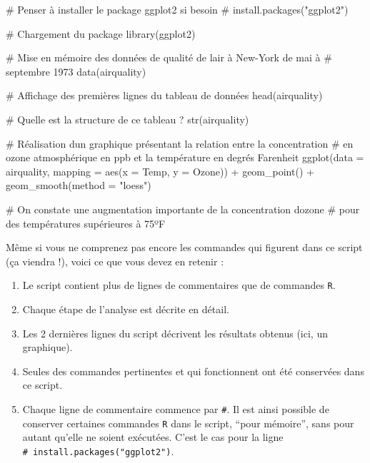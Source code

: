 \documentclass[
  letterpaper,
  DIV=11,
  numbers=noendperiod]{scrreprt}
\newenvironment{Shaded}{\begin{snugshade}}{\end{snugshade}}
\newcommand{\AttributeTok}[1]{\textcolor[rgb]{0.40,0.45,0.13}{#1}}
\newcommand{\CommentTok}[1]{\textcolor[rgb]{0.37,0.37,0.37}{#1}}
\newcommand{\FunctionTok}[1]{\textcolor[rgb]{0.28,0.35,0.67}{#1}}
\newcommand{\NormalTok}[1]{\textcolor[rgb]{0.00,0.23,0.31}{#1}}
\newcommand{\SpecialCharTok}[1]{\textcolor[rgb]{0.37,0.37,0.37}{#1}}
\newcommand{\StringTok}[1]{\textcolor[rgb]{0.13,0.47,0.30}{#1}}
\providecommand{\tightlist}{%
  \setlength{\itemsep}{0pt}\setlength{\parskip}{0pt}}\usepackage{longtable,booktabs,array}
\begin{document}
\begin{Shaded}
\begin{Highlighting}[]
\CommentTok{\# Penser à installer le package ggplot2 si besoin}
\CommentTok{\# install.packages("ggplot2")}

\CommentTok{\# Chargement du package}
\FunctionTok{library}\NormalTok{(ggplot2)}

\CommentTok{\# Mise en mémoire des données de qualité de l\textquotesingle{}air à New{-}York de mai à}
\CommentTok{\# septembre 1973}
\FunctionTok{data}\NormalTok{(airquality)}

\CommentTok{\# Affichage des premières lignes du tableau de données}
\FunctionTok{head}\NormalTok{(airquality)}

\CommentTok{\# Quelle est la structure de ce tableau ?}
\FunctionTok{str}\NormalTok{(airquality)}

\CommentTok{\# Réalisation d\textquotesingle{}un graphique présentant la relation entre la concentration}
\CommentTok{\# en ozone atmosphérique en ppb et la température en degrés Farenheit}
\FunctionTok{ggplot}\NormalTok{(}\AttributeTok{data =}\NormalTok{ airquality, }\AttributeTok{mapping =} \FunctionTok{aes}\NormalTok{(}\AttributeTok{x =}\NormalTok{ Temp, }\AttributeTok{y =}\NormalTok{ Ozone)) }\SpecialCharTok{+}
  \FunctionTok{geom\_point}\NormalTok{() }\SpecialCharTok{+}
  \FunctionTok{geom\_smooth}\NormalTok{(}\AttributeTok{method =} \StringTok{"loess"}\NormalTok{)}

\CommentTok{\# On constate une augmentation importante de la concentration d\textquotesingle{}ozone }
\CommentTok{\# pour des températures supérieures à 75ºF}
\end{Highlighting}
\end{Shaded}

Même si vous ne comprenez pas encore les commandes qui figurent dans ce
script (ça viendra !), voici ce que vous devez en retenir :

\begin{enumerate}
\def\labelenumi{\arabic{enumi}.}
\tightlist
\item
  Le script contient plus de lignes de commentaires que de commandes
  \texttt{R}.
\item
  Chaque étape de l'analyse est décrite en détail.
\item
  Les 2 dernières lignes du script décrivent les résultats obtenus (ici,
  un graphique).
\item
  Seules des commandes pertinentes et qui fonctionnent ont été
  conservées dans ce script.
\item
  Chaque ligne de commentaire commence par \texttt{\#}. Il est ainsi
  possible de conserver certaines commandes \texttt{R} dans le script,
  ``pour mémoire'', sans pour autant qu'elle ne soient exécutées. C'est
  le cas pour la ligne \texttt{\#\ install.packages("ggplot2")}.
\end{enumerate}
\end{document}
